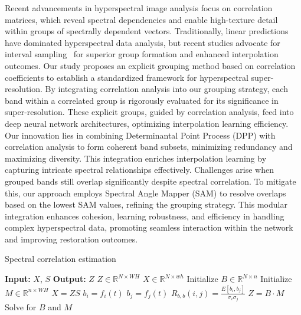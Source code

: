 Recent advancements in hyperspectral image analysis focus on correlation matrices, which reveal spectral dependencies and enable high-texture detail within groups of spectrally dependent vectors. Traditionally, linear predictions~\cite{manolakis2008spectral} have dominated hyperspectral data analysis, but recent studies advocate for interval sampling~\cite{wang2022group} for superior group formation and enhanced interpolation outcomes. Our study proposes an explicit grouping method based on correlation coefficients to establish a standardized framework for hyperspectral super-resolution. By integrating correlation analysis into our grouping strategy, each band within a correlated group is rigorously evaluated for its significance in super-resolution. These explicit groups, guided by correlation analysis, feed into deep neural network architectures, optimizing interpolation learning efficiency. Our innovation lies in combining Determinantal Point Process (DPP) with correlation analysis to form coherent band subsets, minimizing redundancy and maximizing diversity. This integration enriches interpolation learning by capturing intricate spectral relationships effectively. Challenges arise when grouped bands still overlap significantly despite spectral correlation. To mitigate this, our approach employs Spectral Angle Mapper (SAM) to resolve overlaps based on the lowest SAM values, refining the grouping strategy. This modular integration enhances cohesion, learning robustness, and efficiency in handling complex hyperspectral data, promoting seamless interaction within the network and improving restoration outcomes.
\begin{algorithm}
\caption{Spectral correlation estimation}
\label{algo: Algorithm1}
\begin{algorithmic}[1]
\State \textbf{Input:} \(X\), \(S\)
\State \textbf{Output:} \(Z\)
\State \(Z \in \mathbb{R}^{N \times WH}\)
\State \(X \in \mathbb{R}^{N \times wh}\)
\State Initialize \(B \in \mathbb{R}^{N \times n}\)
\State Initialize \(M \in \mathbb{R}^{n \times WH}\)
\State \(X = ZS\)
    \State \(b_i = f_i(t)\)
    \State \(b_j = f_j(t)\)
    \State \(R_{b,b}(i, j) = \frac{E[b_i, b_j]}{\sigma_i \sigma_j}\)
\EndFor
\State \(Z = B \cdot M\)
\State Solve for \(B\) and \(M\)
\end{algorithmic}
\end{algorithm}